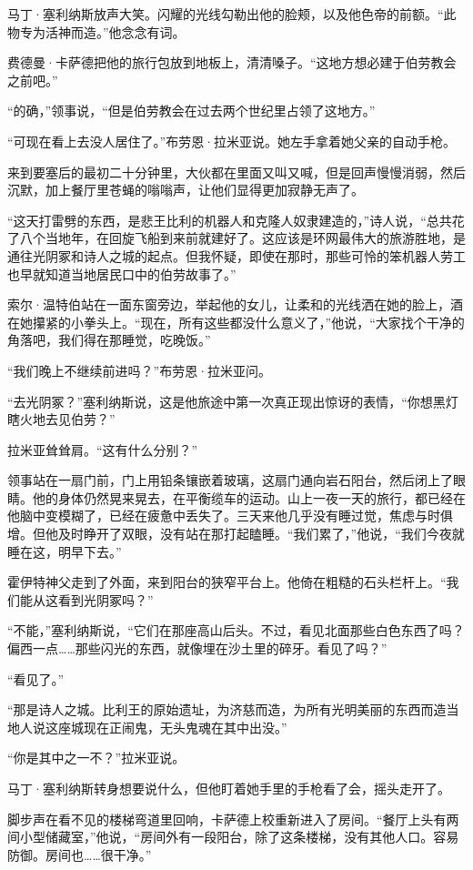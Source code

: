 \documentclass[AutoFakeBold=true]{book}
\begin{document}
马丁·塞利纳斯放声大笑。闪耀的光线勾勒出他的脸颊，以及他色帝的前额。``此物专为活神而造。''他念念有词。

费德曼·卡萨德把他的旅行包放到地板上，清清嗓子。``这地方想必建于伯劳教会之前吧。''

``的确，''领事说，``但是伯劳教会在过去两个世纪里占领了这地方。''

``可现在看上去没人居住了。''布劳恩·拉米亚说。她左手拿着她父亲的自动手枪。

来到要塞后的最初二十分钟里，大伙都在里面又叫又喊，但是回声慢慢消弱，然后沉默，加上餐厅里苍蝇的嗡嗡声，让他们显得更加寂静无声了。

``这天打雷劈的东西，是悲王比利的机器人和克隆人奴隶建造的，''诗人说，``总共花了八个当地年，在回旋飞船到来前就建好了。这应该是环网最伟大的旅游胜地，是通往光阴冢和诗人之城的起点。但我怀疑，即使在那时，那些可怜的笨机器人劳工也早就知道当地居民口中的伯劳故事了。''

索尔·温特伯站在一面东窗旁边，举起他的女儿，让柔和的光线洒在她的脸上，酒在她攥紧的小拳头上。``现在，所有这些都没什么意义了，''他说，``大家找个干净的角落吧，我们得在那睡觉，吃晚饭。''

``我们晚上不继续前进吗？''布劳恩·拉米亚问。

``去光阴冢？''塞利纳斯说，这是他旅途中第一次真正现出惊讶的表情，``你想黑灯瞎火地去见伯劳？''

拉米亚耸耸肩。``这有什么分别？''

领事站在一扇门前，门上用铅条镶嵌着玻璃，这扇门通向岩石阳台，然后闭上了眼睛。他的身体仍然晃来晃去，在平衡缆车的运动。山上一夜一天的旅行，都已经在他脑中变模糊了，已经在疲惫中丢失了。三天来他几乎没有睡过觉，焦虑与时俱增。但他及时睁开了双眼，没有站在那打起瞌睡。``我们累了，''他说，``我们今夜就睡在这，明早下去。''

霍伊特神父走到了外面，来到阳台的狭窄平台上。他倚在粗糙的石头栏杆上。``我们能从这看到光阴冢吗？''

``不能，''塞利纳斯说，``它们在那座高山后头。不过，看见北面那些白色东西了吗？偏西一点……那些闪光的东西，就像埋在沙土里的碎牙。看见了吗？''

``看见了。''

``那是诗人之城。比利王的原始遗址，为济慈而造，为所有光明美丽的东西而造当地人说这座城现在正闹鬼，无头鬼魂在其中出没。''

``你是其中之一不？''拉米亚说。

马丁·塞利纳斯转身想要说什么，但他盯着她手里的手枪看了会，摇头走开了。

脚步声在看不见的楼梯弯道里回响，卡萨德上校重新进入了房间。``餐厅上头有两间小型储藏室，''他说，``房间外有一段阳台，除了这条楼梯，没有其他人口。容易防御。房间也……很干净。''
\end{document}
